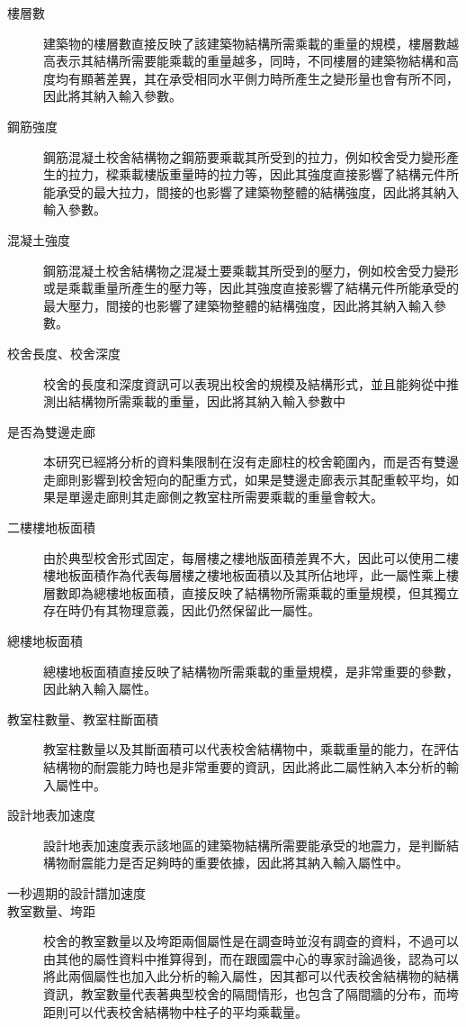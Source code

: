 \begin{description}
  \item[樓層數]
  建築物的樓層數直接反映了該建築物結構所需乘載的重量的規模，樓層數越高表示其結構所需要能乘載的重量越多，同時，不同樓層的建築物結構和高度均有顯著差異，其在承受相同水平側力時所產生之變形量也會有所不同，因此將其納入輸入參數。
  \item[鋼筋強度]
  鋼筋混凝土校舍結構物之鋼筋要乘載其所受到的拉力，例如校舍受力變形產生的拉力，樑乘載樓版重量時的拉力等，因此其強度直接影響了結構元件所能承受的最大拉力，間接的也影響了建築物整體的結構強度，因此將其納入輸入參數。
  \item[混凝土強度]
  鋼筋混凝土校舍結構物之混凝土要乘載其所受到的壓力，例如校舍受力變形或是乘載重量所產生的壓力等，因此其強度直接影響了結構元件所能承受的最大壓力，間接的也影響了建築物整體的結構強度，因此將其納入輸入參數。
  \item[校舍長度、校舍深度]
  校舍的長度和深度資訊可以表現出校舍的規模及結構形式，並且能夠從中推測出結構物所需乘載的重量，因此將其納入輸入參數中
  \item[是否為雙邊走廊]
  本研究已經將分析的資料集限制在沒有走廊柱的校舍範圍內，而是否有雙邊走廊則影響到校舍短向的配重方式，如果是雙邊走廊表示其配重較平均，如果是單邊走廊則其走廊側之教室柱所需要乘載的重量會較大。
  \item[二樓樓地板面積]
  由於典型校舍形式固定，每層樓之樓地版面積差異不大，因此可以使用二樓樓地板面積作為代表每層樓之樓地板面積以及其所佔地坪，此一屬性乘上樓層數即為總樓地板面積，直接反映了結構物所需乘載的重量規模，但其獨立存在時仍有其物理意義，因此仍然保留此一屬性。
  \item[總樓地板面積]
  總樓地板面積直接反映了結構物所需乘載的重量規模，是非常重要的參數，因此納入輸入屬性。
  \item[教室柱數量、教室柱斷面積]
  教室柱數量以及其斷面積可以代表校舍結構物中，乘載重量的能力，在評估結構物的耐震能力時也是非常重要的資訊，因此將此二屬性納入本分析的輸入屬性中。
  \item[設計地表加速度]
  設計地表加速度表示該地區的建築物結構所需要能承受的地震力，是判斷結構物耐震能力是否足夠時的重要依據，因此將其納入輸入屬性中。
  \item[一秒週期的設計譜加速度]
  \item[教室數量、垮距]
  校舍的教室數量以及垮距兩個屬性是在調查時並沒有調查的資料，不過可以由其他的屬性資料中推算得到，而在跟國震中心的專家討論過後，認為可以將此兩個屬性也加入此分析的輸入屬性，因其都可以代表校舍結構物的結構資訊，教室數量代表著典型校舍的隔間情形，也包含了隔間牆的分布，而垮距則可以代表校舍結構物中柱子的平均乘載量。
\end{description}


